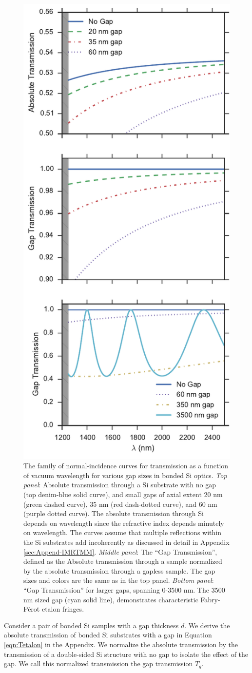 \documentclass[osajnl,preprint,showpacs,superscriptaddress,12pt]{revtex4-1} %
\begin{document}
\begin{figure}[!htbp]
\includegraphics[width=0.40\columnwidth]{figs/etalon_trans.pdf}
\caption{\label{figAbsoluteTrans}The family of normal-incidence curves for transmission as a function of vacuum wavelength for various gap sizes in bonded Si optics.  \emph{Top panel}: Absolute transmission through a Si substrate with no gap (top denim-blue solid curve), and small gaps of axial extent 20 nm (green dashed curve), 35 nm (red dash-dotted curve), and 60 nm (purple dotted curve).  The absolute transmission through Si depends on wavelength since the refractive index depends minutely on wavelength.  The curves assume that multiple reflections within the Si substrates add incoherently as discussed in detail in Appendix \ref{sec:Append-IMRTMM}.  \emph{Middle panel}: The ``Gap Transmission'', defined as the Absolute transmission through a sample normalized by the absolute transmission through a gapless sample. The gap sizes and colors are the same as in the top panel.  \emph{Bottom panel}: ``Gap Transmission'' for larger gaps, spanning 0-3500 nm.  The 3500 nm sized gap (cyan solid line), demonstrates characteristic Fabry-P\`erot etalon fringes.}
\end{figure}

Consider a pair of bonded Si samples with a gap thickness $d$. We derive the absolute transmission of bonded Si substrates with a gap in Equation \ref{eqn:Tetalon} in the Appendix.  We normalize the absolute transmission by the transmission of a double-sided Si structure with no gap to isolate the effect of the gap.  We call this normalized transmission the gap transmission $T_{g}$.
\end{document}

